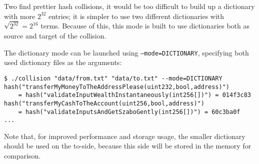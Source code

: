 Two find prettier hash collisions, it would be too difficult to build up a dictionary with more \( 2^{32} \) entries; it is simpler to use two different dictionaries with \( \sqrt{2^{32}} = 2^{16} \) terms. Because of this, this mode is built to use dictionaries both as source and target of the collision.

The dictionary mode can be launched using \texttt{--mode=DICTIONARY}, specifying both used dictionary files as the arguments:
\begin{verbatim}
$ ./collision "data/from.txt" "data/to.txt" --mode=DICTIONARY
hash("transferMyMoneyToTheAddressPlease(uint232,bool,address)")
    = hash("validateInputWealthInstantaneously(int256[])") = 014f3c83
hash("transferMyCashToTheAccount(uint256,bool,address)")
    = hash("validateInputsAndGetSzaboGently(int256[])") = 60c3ba0f
...
\end{verbatim}

Note that, for improved performance and storage usage, the smaller dictionary should be used on the to-side, because this side will be stored in the memory for comparison.

\pagebreak{}
